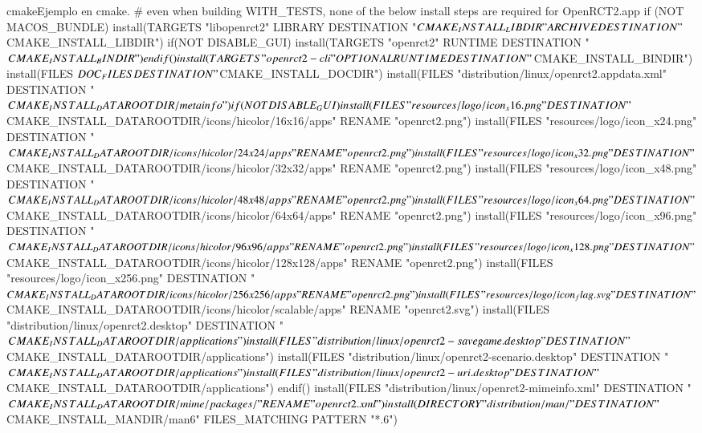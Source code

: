 \begin{sourcecode}{cmake}{Ejemplo en cmake.}
    # even when building WITH_TESTS, none of the below install steps are required for OpenRCT2.app
    if (NOT MACOS_BUNDLE)
        install(TARGETS "libopenrct2" LIBRARY DESTINATION "${CMAKE_INSTALL_LIBDIR}"
                                    ARCHIVE DESTINATION "${CMAKE_INSTALL_LIBDIR}")
        if(NOT DISABLE_GUI)
            install(TARGETS "openrct2" RUNTIME DESTINATION "${CMAKE_INSTALL_BINDIR}")
        endif()
        install(TARGETS "openrct2-cli" OPTIONAL RUNTIME DESTINATION "${CMAKE_INSTALL_BINDIR}")
        install(FILES ${DOC_FILES} DESTINATION "${CMAKE_INSTALL_DOCDIR}")
        install(FILES "distribution/linux/openrct2.appdata.xml" DESTINATION "${CMAKE_INSTALL_DATAROOTDIR}/metainfo")
        if (NOT DISABLE_GUI)
            install(FILES "resources/logo/icon_x16.png" DESTINATION "${CMAKE_INSTALL_DATAROOTDIR}/icons/hicolor/16x16/apps" RENAME "openrct2.png")
            install(FILES "resources/logo/icon_x24.png" DESTINATION "${CMAKE_INSTALL_DATAROOTDIR}/icons/hicolor/24x24/apps" RENAME "openrct2.png")
            install(FILES "resources/logo/icon_x32.png" DESTINATION "${CMAKE_INSTALL_DATAROOTDIR}/icons/hicolor/32x32/apps" RENAME "openrct2.png")
            install(FILES "resources/logo/icon_x48.png" DESTINATION "${CMAKE_INSTALL_DATAROOTDIR}/icons/hicolor/48x48/apps" RENAME "openrct2.png")
            install(FILES "resources/logo/icon_x64.png" DESTINATION "${CMAKE_INSTALL_DATAROOTDIR}/icons/hicolor/64x64/apps" RENAME "openrct2.png")
            install(FILES "resources/logo/icon_x96.png" DESTINATION "${CMAKE_INSTALL_DATAROOTDIR}/icons/hicolor/96x96/apps" RENAME "openrct2.png")
            install(FILES "resources/logo/icon_x128.png" DESTINATION "${CMAKE_INSTALL_DATAROOTDIR}/icons/hicolor/128x128/apps" RENAME "openrct2.png")
            install(FILES "resources/logo/icon_x256.png" DESTINATION "${CMAKE_INSTALL_DATAROOTDIR}/icons/hicolor/256x256/apps" RENAME "openrct2.png")
            install(FILES "resources/logo/icon_flag.svg" DESTINATION "${CMAKE_INSTALL_DATAROOTDIR}/icons/hicolor/scalable/apps" RENAME "openrct2.svg")
            install(FILES "distribution/linux/openrct2.desktop" DESTINATION "${CMAKE_INSTALL_DATAROOTDIR}/applications")
            install(FILES "distribution/linux/openrct2-savegame.desktop" DESTINATION "${CMAKE_INSTALL_DATAROOTDIR}/applications")
            install(FILES "distribution/linux/openrct2-scenario.desktop" DESTINATION "${CMAKE_INSTALL_DATAROOTDIR}/applications")
            install(FILES "distribution/linux/openrct2-uri.desktop" DESTINATION "${CMAKE_INSTALL_DATAROOTDIR}/applications")
        endif()
        install(FILES "distribution/linux/openrct2-mimeinfo.xml" DESTINATION "${CMAKE_INSTALL_DATAROOTDIR}/mime/packages/" RENAME "openrct2.xml")
        install(DIRECTORY "distribution/man/" DESTINATION "${CMAKE_INSTALL_MANDIR}/man6" FILES_MATCHING PATTERN "*.6")


\end{sourcecode}

